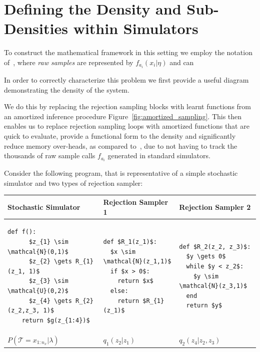 \documentclass{article}
\begin{document}
\section{Defining the Density and Sub-Densities within Simulators}

To construct the mathematical framework in this setting we employ the notation of~\cite{rainforth2017automating}, 
where \emph{raw samples} are represented by $ f_{a_i}(x_i | \eta)$ and can 

In order to correctly characterize this problem we first provide a useful diagram demonstrating 
the density of the system. 

 


%  

We do this by replacing the rejection sampling blocks with 
learnt functions from an amortized inference procedure Figure~\ref{fig:amortized_sampling}.
This then enables us to replace rejection sampling loops with amortized functions that 
are quick to evaluate, provide a functional form to the density and significantly reduce 
memory over-heads, as compared to~\cite{baydin2018efficient}, due to not having to track the 
thousands of raw sample calls $f_{a_i}$ generated in standard simulators. 

Consider the following program, that is representative of a simple stochastic simulator
and two types of rejection sampler:


\noindent
\begin{tabular}{|p{3.6cm}|p{3.6cm}|p{3.6cm}|}
\hline
Stochastic Simulator  & Rejection Sampler 1 & Rejection Sampler 2 \\
\hline
\begin{lstlisting}[mathescape=true]
    def f():
      $z_{1} \sim \mathcal{N}(0,1)$
      $z_{2} \gets R_{1}(z_1, 1)$
      $z_{3} \sim \mathcal{U}(0,2)$
      $z_{4} \gets R_{2}(z_2,z_3, 1)$
    return $g(z_{1:4})$
\end{lstlisting}&
\begin{lstlisting}[mathescape=true]
def $R_1(z_1)$:
  $x \sim \mathcal{N}(z_1,1)$
  if $x > 0$:
    return $x$
  else:
    return $R_{1}(z_1)$
\end{lstlisting}&
\begin{lstlisting}[mathescape=true]
def $R_2(z_2, z_3)$:
  $y \gets 0$
  while $y < z_2$:
    $y \sim \mathcal{N}(z_3,1)$
  end
  return $y$
\end{lstlisting}\\
\hline
$P(\mathcal{T}= x_{1:n_x} | \lambda)$ & $q_{1}(z_{2} | z_{1})$ & $q_{2}(z_{4} |z_{2},z_{3})$ \\
\hline
\end{tabular} 
\end{document}
